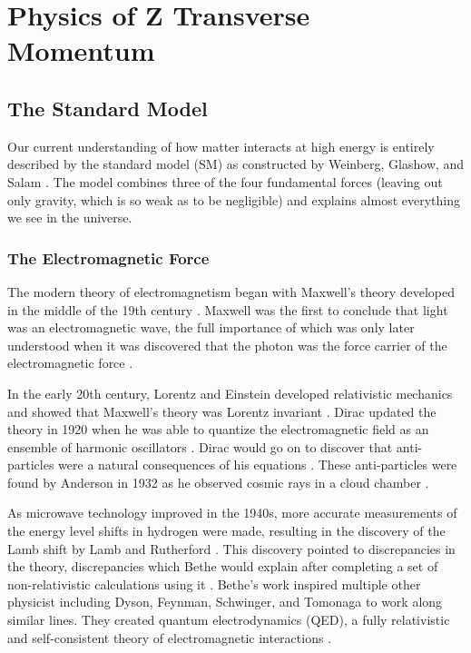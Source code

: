 \chapter{Physics of Z Transverse Momentum}
\label{chapter:theory}

\section{The Standard Model}
\label{section:standard_model}

Our current understanding of how matter interacts at high energy is entirely
described by the standard model (SM) as constructed by Weinberg, Glashow, and
Salam \cite{glashow1961}\cite{weinberg1967}\cite{salam1968}. The model combines
three of the four fundamental forces (leaving out only gravity, which is so
weak as to be negligible) and explains almost everything we see in the
universe.

\subsection{The Electromagnetic Force}
\label{subsection:electronmagnetic_force}

The modern theory of electromagnetism began with Maxwell's theory developed in
the middle of the 19th century \cite{maxwell1873}. Maxwell was the first to
conclude that light was an electromagnetic wave, the full importance of which
was only later understood when it was discovered that the photon was the force
carrier of the electromagnetic force \cite{maxwell1865}.

In the early 20th century, Lorentz and Einstein developed relativistic
mechanics and showed that Maxwell's theory was Lorentz invariant
\cite{lorentz1899}\cite{einstein1904}. Dirac updated the theory in 1920 when he
was able to quantize the electromagnetic field as an ensemble of harmonic
oscillators \cite{dirac1927}. Dirac would go on to discover that anti-particles
were a natural consequences of his equations \cite{dirac1928}\cite{dirac1930}.
These anti-particles were found by Anderson in 1932 as he observed cosmic rays
in a cloud chamber \cite{anderson1933}.

As microwave technology improved in the 1940s, more accurate measurements of
the energy level shifts in hydrogen were made, resulting in the discovery of
the Lamb shift by Lamb and Rutherford \cite{lamb1947}. This discovery pointed
to discrepancies in the theory, discrepancies which Bethe would explain after
completing a set of non-relativistic calculations using it \cite{bethe1947}.
Bethe's work inspired multiple other physicist including Dyson, Feynman,
Schwinger, and Tomonaga to work along similar lines. They created quantum
electrodynamics (QED), a fully relativistic and self-consistent theory of
electromagnetic interactions
\cite{tomonaga1946}\cite{schwinger1948}\cite{feynman1949}\cite{dyson1949}.

